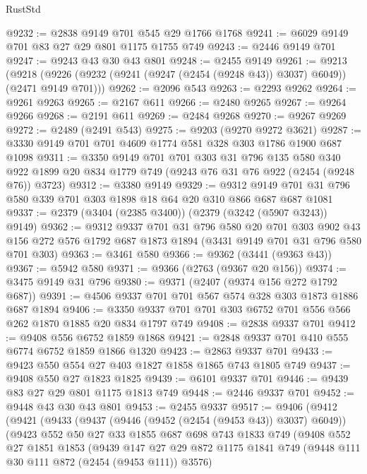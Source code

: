 \begin{lexlean}{RustStd}
\begin{coremodule}
@9232 := @2838 @9149 @701 @545 @29 @1766 @1768
@9241 := @6029 @9149 @701 @83 @27 @29 @801 @1175 @1755 @749
@9243 := @2446 @9149 @701
@9247 := @9243 @43 @30 @43 @801
@9248 := @2455 @9149
@9261 := @9213
    (@9218 (@9226 (@9232 (@9241 (@9247 (@2454 (@9248 @43)) @3037) @6049)) (@2471 @9149 @701)))
@9262 := @2096 @543
@9263 := @2293 @9262
@9264 := @9261 @9263
@9265 := @2167 @611
@9266 := @2480 @9265
@9267 := @9264 @9266
@9268 := @2191 @611
@9269 := @2484 @9268
@9270 := @9267 @9269
@9272 := @2489 (@2491 @543)
@9275 := @9203 (@9270 @9272 @3621)
@9287 := @3330 @9149 @701 @701 @4609 @1774 @581 @328 @303 @1786 @1900 @687 @1098
@9311 := @3350
    @9149
    @701
    @701
    @303
    @31
    @796
    @135
    @580
    @340
    @922
    @1899
    @20
    @834
    @1779
    @749
    (@9243 @76 @31 @76 @922 (@2454 (@9248 @76)) @3723)
@9312 := @3380 @9149
@9329 := @9312 @9149 @701 @31 @796 @580 @339 @701 @303 @1898 @18 @64 @20 @310 @866 @687 @687 @1081
@9337 := @2379 (@3404 (@2385 @3400)) (@2379 (@3242 (@5907 @3243)) @9149)
@9362 := @9312
    @9337
    @701
    @31
    @796
    @580
    @20
    @701
    @303
    @902
    @43
    @156
    @272
    @576
    @1792
    @687
    @1873
    @1894
    (@3431 @9149 @701 @31 @796 @580 @701 @303)
@9363 := @3461 @580
@9366 := @9362 (@3441 (@9363 @43))
@9367 := @5942 @580
@9371 := @9366 (@2763 (@9367 @20 @156))
@9374 := @3475 @9149 @31 @796
@9380 := @9371 (@2407 (@9374 @156 @272 @1792 @687))
@9391 := @4506 @9337 @701 @701 @567 @574 @328 @303 @1873 @1886 @687 @1894
@9406 := @3350 @9337 @701 @701 @303 @6752 @701 @556 @566 @262 @1870 @1885 @20 @834 @1797 @749
@9408 := @2838 @9337 @701
@9412 := @9408 @556 @6752 @1859 @1868
@9421 := @2848 @9337 @701 @410 @555 @6774 @6752 @1859 @1866 @1320
@9423 := @2863 @9337 @701
@9433 := @9423 @550 @554 @27 @403 @1827 @1858 @1865 @743 @1805 @749
@9437 := @9408 @550 @27 @1823 @1825
@9439 := @6101 @9337 @701
@9446 := @9439 @83 @27 @29 @801 @1175 @1813 @749
@9448 := @2446 @9337 @701
@9452 := @9448 @43 @30 @43 @801
@9453 := @2455 @9337
@9517 := @9406
    (@9412
      (@9421
        (@9433
          (@9437 (@9446 (@9452 (@2454 (@9453 @43)) @3037) @6049))
          (@9423
            @552
            @50
            @27
            @33
            @1855
            @687
            @698
            @743
            @1833
            @749
            (@9408
              @552
              @27
              @1851
              @1853
              (@9439
                @147
                @27
                @29
                @872
                @1175
                @1841
                @749
                (@9448 @111 @30 @111 @872 (@2454 (@9453 @111)) @3576)

\end{coremodule}
\end{lexlean}
